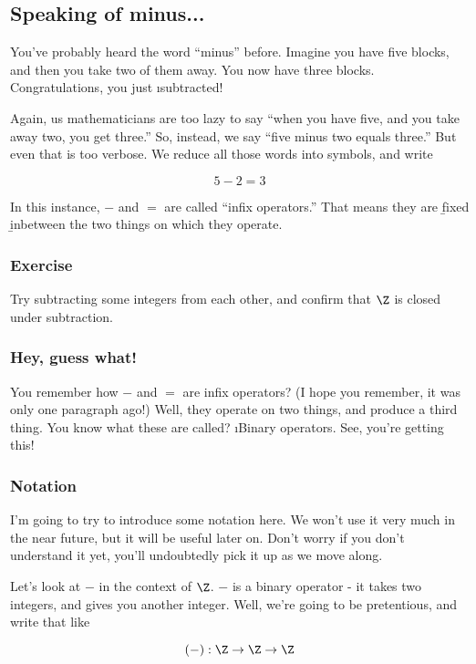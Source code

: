 \subsection{Speaking of minus...}

You've probably heard the word ``minus'' before. Imagine you have five blocks,
and then you take two of them away. You now have three blocks. Congratulations,
you just \i{subtracted}! 

Again, us mathematicians are too lazy to say ``when you have five, and you take
away two, you get three.'' So, instead, we say ``five minus two equals three.''
But even that is too verbose. We reduce all those words into symbols, and write

\[ 5 - 2 = 3 \]

In this instance, $-$ and $=$ are called ``infix operators.'' That means they
are \b{fix}ed \b{in}between the two things on which they operate.

\subsubsection{Exercise}

Try subtracting some integers from each other, and confirm that $\Z$ is closed
under subtraction.

\subsubsection{Hey, guess what!}

You remember how $-$ and $=$ are infix operators? (I hope you remember, it was
only one paragraph ago!) Well, they operate on two things, and produce a third
thing. You know what these are called? \i{Binary operators}. See, you're getting
this!

\subsubsection{Notation}

I'm going to try to introduce some notation here. We won't use it very much in
the near future, but it will be useful later on. Don't worry if you don't
understand it yet, you'll undoubtedly pick it up as we move along.

Let's look at $-$ in the context of $\Z$. $-$ is a binary operator - it takes two
integers, and gives you another integer. Well, we're going to be pretentious,
and write that like 

\[ (-) : \Z \to \Z \to \Z \]

